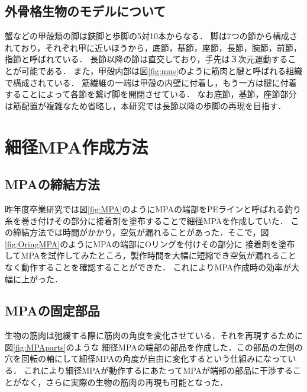 \documentclass{jarticle}
\begin{document}
\vspace*{-1mm}
\subsection{外骨格生物のモデルについて}

蟹などの甲殻類の脚は鋏脚と歩脚の5対10本からなる．
脚は7つの節から構成されており，それぞれ甲に近いほうから，底節，基節，座節，長節，腕節，前節，指節と呼ばれている\cite{crab}．
長節以降の節は直交しており，手先は３次元運動することが可能である．
また，甲殻内部は図\ref{fig:mus}のように筋肉と腱と呼ばれる組織で構成されている．
筋繊維の一端は甲殻の内壁に付着し，もう一方は腱に付着することによって各節を繋げ脚を開閉させている．
なお底節，基節，座節部分は筋配置が複雑なため省略し，本研究では長節以降の歩脚の再現を目指す．

\vspace*{-2mm}
\section{細径MPA作成方法}

\vspace*{-1mm}
\subsection{MPAの締結方法}

昨年度卒業研究では図\ref{fig:MPA}のようにMPAの端部をPEラインと呼ばれる釣り糸を巻き付けその部分に接着剤を塗布することで細径MPAを作成していた．
この締結方法では時間がかかり，空気が漏れることがあった．そこで，図\ref{fig:OringMPA}のようにMPAの端部にOリングを付けその部分に
接着剤を塗布してMPAを試作してみたところ，製作時間を大幅に短縮でき空気が漏れることなく動作することを確認することができた．
これによりMPA作成時の効率が大幅に上がった．

\vspace*{-1mm}
\subsection{MPAの固定部品}

生物の筋肉は弛緩する際に筋肉の角度を変化させている．それを再現するために図\ref{fig:MPAparts}のような
細径MPAの端部の部品を作成した．この部品の左側の穴を回転の軸にして細径MPAの角度が自由に変化するという仕組みになっている．
これにより細径MPAが動作するにあたってMPAが端部の部品に干渉することがなく，さらに実際の生物の筋肉の再現も可能となった．
\end{document}
